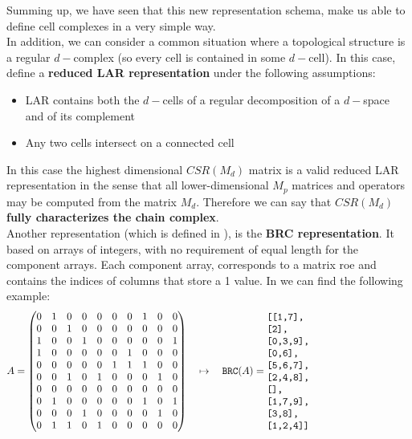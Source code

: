 Summing up, we have seen that this new representation schema, make us able to define cell complexes in a very simple way.\\

In addition, we can consider a common situation where a topological structure is a regular $d-$complex (so every cell is contained in some $d-$cell). In this case, \cite{DiCarlo} define a \textbf{reduced LAR representation} under the following assumptions:
\begin{itemize}
 \item LAR contains both the $d-$cells of a regular decomposition of a $d-$space and of its complement
 \item Any two cells intersect on a connected cell
\end{itemize}

In this case the highest dimensional $CSR(M_d)$ matrix is a valid reduced LAR representation in the sense that all lower-dimensional $M_p$ matrices and operators may be computed from the matrix $M_d$. Therefore we can say that $CSR(M_d)$ \textbf{fully characterizes the chain complex}.\\

Another representation (which is defined in \cite{cclar}), is the \textbf{BRC representation}. It based on arrays of integers, with no requirement of equal length for the component arrays. Each component array, corresponds to a matrix roe and contains the indices of columns that store a 1 value. In \cite{cclar} we can find the following example:
\[
A = \begin{pmatrix}
0 & 1 & 0 & 0 & 0 & 0 & 0 & 1 & 0 & 0\\
0 & 0 & 1 & 0 & 0 & 0 & 0 & 0 & 0 & 0\\
1 & 0 & 0 & 1 & 0 & 0 & 0 & 0 & 0 & 1\\
1 & 0 & 0 & 0 & 0 & 0 & 1 & 0 & 0 & 0\\
0 & 0 & 0 & 0 & 0 & 1 & 1 & 1 & 0 & 0\\
0 & 0 & 1 & 0 & 1 & 0 & 0 & 0 & 1 & 0\\
0 & 0 & 0 & 0 & 0 & 0 & 0 & 0 & 0 & 0\\
0 & 1 & 0 & 0 & 0 & 0 & 0 & 1 & 0 & 1\\
0 & 0 & 0 & 1 & 0 & 0 & 0 & 0 & 1 & 0\\
0 & 1 & 1 & 0 & 1 & 0 & 0 & 0 & 0 & 0\\
\end{pmatrix}
\quad\mapsto\quad \texttt{BRC}(A) =
\begin{minipage}[c]{5cm}
\begin{verbatim}
[[1,7],
 [2],
 [0,3,9],
 [0,6],
 [5,6,7],
 [2,4,8],
 [],
 [1,7,9],
 [3,8],
 [1,2,4]]
\end{verbatim}
\end{minipage}
\]

